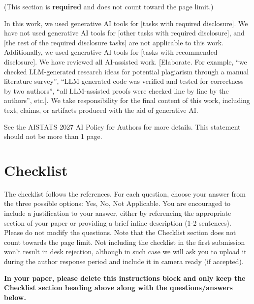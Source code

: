 \documentclass[twoside]{article}
\theoremstyle{plain}
\theoremstyle{definition}
\theoremstyle{remark}
\newtheorem{proof sketch}[theorem]{Proof Sketch}
\begin{document}
(This section is \textbf{required} and does not count toward the page limit.)

In this work, we used generative AI tools for [tasks with required disclosure].
We have not used generative AI tools for [other tasks with required disclosure], and [the rest of the required disclosure tasks] are not applicable to this work.
Additionally, we used generative AI tools for [tasks with recommended disclosure].
We have reviewed all AI-assisted work.
[Elaborate. For example, ``we checked LLM-generated research ideas for potential plagiarism through a manual literature survey'', ``LLM-generated code was verified and tested for correctness by two authors'', ``all LLM-assisted proofs were checked line by line by the authors'', etc.].
We take responsibility for the final content of this work, including text, claims, or artifacts produced with the aid of generative AI.

See the AISTATS 2027 AI Policy for Authors for more details. This statement should not be more than 1 page.

\newpage


\section*{Checklist}


The checklist follows the references. For each question, choose your answer from the three possible options: Yes, No, Not Applicable.  You are encouraged to include a justification to your answer, either by referencing the appropriate section of your paper or providing a brief inline description (1-2 sentences).
Please do not modify the questions.  Note that the Checklist section does not count towards the page limit. Not including the checklist in the first submission won't result in desk rejection, although in such case we will ask you to upload it during the author response period and include it in camera ready (if accepted).

\textbf{In your paper, please delete this instructions block and only keep the Checklist section heading above along with the questions/answers below.}
\end{document}
